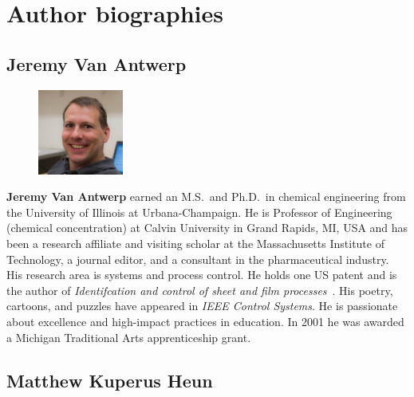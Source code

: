 

\chapter*{Author biographies}


\section*{Jeremy Van Antwerp}

\setlength{\intextsep}{-7pt}%
\setlength{\columnsep}{8pt}%
\begin{figure}
  \begin{center}
    \includegraphics[width=0.25\textwidth]{headshots/jva-headshot.jpeg}
  \end{center}
\end{figure}
\textbf{Jeremy Van Antwerp} earned an M.S.\ and Ph.D.\ in chemical engineering 
from the University of Illinois at Urbana-Champaign. 
He is Professor of Engineering (chemical concentration)
at Calvin University in Grand Rapids, MI, USA
and has been a research affiliate and visiting scholar at the Massachusetts 
Institute of Technology, a journal editor, and a consultant in the pharmaceutical 
industry.
His research area is systems and process control.
He holds one US patent and is the author of \emph{Identifcation and control of 
sheet and film processes}~\cite{FeaVB2000}.
His poetry, cartoons, and puzzles have appeared in \emph{IEEE Control Systems}.
He is passionate about excellence and high-impact practices in education.
In 2001 he was awarded a Michigan Traditional Arts apprenticeship grant.


\section*{Matthew Kuperus Heun}

